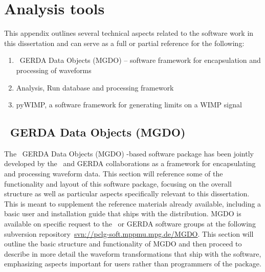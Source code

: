 

\chapter{Analysis tools}
\label{app:MGDO}

This appendix outlines several technical aspects related to the software work in this dissertation and can serve as a full or partial reference for the following:

	\begin{enumerate}
		\item \MJ~GERDA Data Objects (MGDO) -- software framework for encapsulation and processing of waveforms
		\item Analysis, Run database and processing framework
		\item pyWIMP, a software framework for generating limits on a WIMP signal
	\end{enumerate}

	\section{\MJ~GERDA Data Objects (MGDO)}
	\label{sec:WaveformProcMGDO}
	
	
	The \MJ~GERDA Data Objects (MGDO) \cpp-based software package has been jointly developed by the \MJ~and GERDA collaborations as
a framework for encapsulating and processing waveform data.  This section will reference some of the functionality and layout of this
software package, focusing on the overall structure as well as particular aspects specifically relevant to this dissertation.  This is meant
to supplement the reference materials already available, including a basic user and installation guide that ships with the distribution.  MGDO is available on specific request to the \MJ~or GERDA software groups at the following subversion repository~\url{svn://pclg-soft.mppmu.mpg.de/MGDO}.  This section will outline the basic structure and functionality of MGDO and then proceed to describe
in more detail the waveform transformations that ship with the software, emphasizing aspects important for users rather than programmers of the package.  

